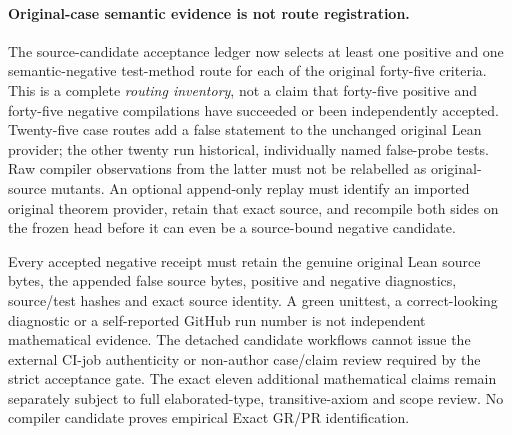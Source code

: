 \paragraph{Original-case semantic evidence is not route registration.}
The source-candidate acceptance ledger now selects at least one positive
and one semantic-negative test-method route for each of the original
forty-five criteria. This is a complete \emph{routing inventory}, not a
claim that forty-five positive and forty-five negative compilations have
succeeded or been independently accepted. Twenty-five case routes
add a false statement to the unchanged original Lean provider; the
other twenty run historical, individually named false-probe tests.
Raw compiler observations from the latter must not be relabelled as
original-source mutants. An optional append-only replay must identify
an imported original theorem provider, retain that exact source,
and recompile both sides on the frozen head before it can even be a
source-bound negative candidate.

Every accepted negative receipt must retain the genuine original Lean
source bytes, the appended false source bytes, positive and negative
diagnostics, source/test hashes and exact source identity. A green
unittest, a correct-looking diagnostic or a self-reported GitHub run
number is not independent mathematical evidence. The detached
candidate workflows cannot issue the external CI-job authenticity
or non-author case/claim review required by the strict acceptance gate.
The exact eleven additional mathematical claims remain separately
subject to full elaborated-type, transitive-axiom and scope review.
No compiler candidate proves empirical Exact GR/PR identification.
